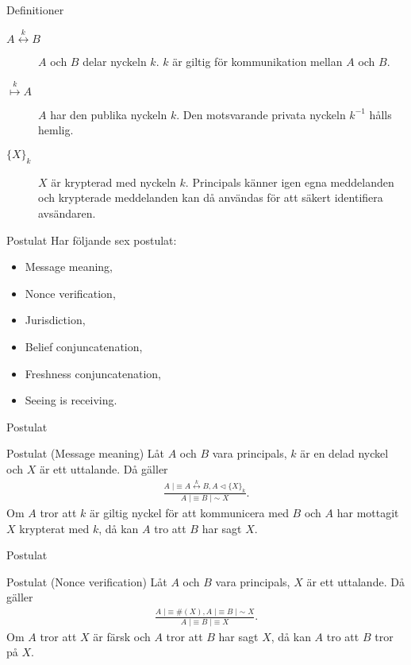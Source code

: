\documentclass{beamer}
\theoremstyle{definition}
\newenvironment{axiom}[1]{\begin{block}{Postulat (#1)}}{\end{block}}
\theoremstyle{remark}
\DeclareMathOperator{\believes}{|\!\!\!\equiv}
\DeclareMathOperator{\said}{|\!\!\!\sim}
\DeclareMathOperator{\sees}{\lhd}
\newcommand{\fresh}[1]{\#(#1)}
\newcommand{\encrypt}[2]{\{#1\}_{#2}}
\newcommand{\share}[1]{\stackrel{#1}{\leftrightarrow}}
\newcommand{\pubkey}[1]{\stackrel{#1}{\mapsto}}
\begin{document}
\begin{frame}{Definitioner}
  \begin{description}
    \item[\(A\share{k} B\)] \(A\) och \(B\) delar nyckeln \(k\).
      \(k\) är giltig för kommunikation mellan \(A\) och \(B\).
    \item[\(\pubkey{k} A\)] \(A\) har den publika nyckeln \(k\).
      Den motsvarande privata nyckeln \(k^{-1}\) hålls hemlig.
    \item[\(\encrypt{X}{k}\)] \(X\) är krypterad med nyckeln \(k\).
      Principals känner igen egna meddelanden och krypterade meddelanden kan då 
      användas för att säkert identifiera avsändaren.
  \end{description}
\end{frame}

\begin{frame}{Postulat}
  Har följande sex postulat:
  \begin{itemize}
    \item Message meaning,
    \item Nonce verification,
    \item Jurisdiction,
    \item Belief conjuncatenation,
    \item Freshness conjuncatenation,
    \item Seeing is receiving.
  \end{itemize}
\end{frame}

\begin{frame}{Postulat}
  \begin{axiom}{Message meaning}
    Låt \(A\) och \(B\) vara principals, \(k\) är en delad nyckel och \(X\) är 
    ett uttalande.
    Då gäller
    \begin{align*}
      \frac{A\believes A\share{k} B, A\sees \encrypt{X}{k}}%
        {A\believes B\said X}.
    \end{align*}
    Om \(A\) tror att \(k\) är giltig nyckel för att kommunicera med \(B\) och 
    \(A\) har mottagit \(X\) krypterat med \(k\),
    då kan \(A\) tro att \(B\) har sagt \(X\).
  \end{axiom}
\end{frame}

\begin{frame}{Postulat}
  \begin{axiom}{Nonce verification}
    Låt \(A\) och \(B\) vara principals, \(X\) är ett uttalande.
    Då gäller
    \begin{align*}
      \frac{A\believes \fresh X, A\believes B\said X}%
        {A\believes B\believes X}.
    \end{align*}
    Om \(A\) tror att \(X\) är färsk och \(A\) tror att \(B\) har sagt \(X\),
    då kan \(A\) tro att \(B\) tror på \(X\).
  \end{axiom}
\end{frame}
\end{document}

